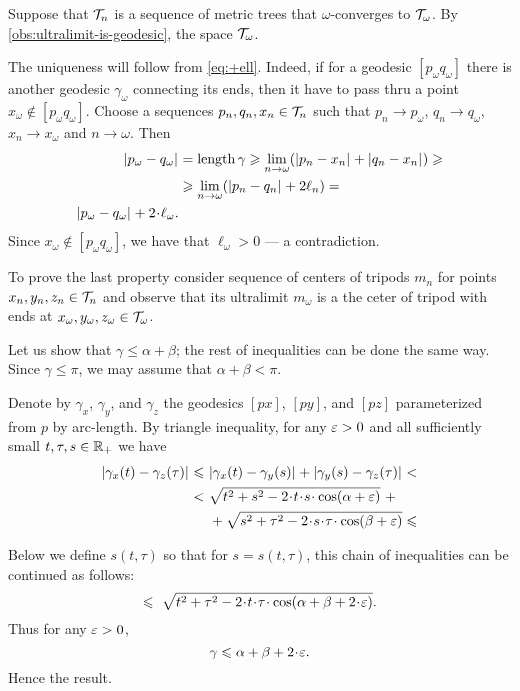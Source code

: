 Suppose that $\mathcal{T}_n$ is a sequence of metric trees that $\omega$-converges to $\mathcal{T}_\omega$.
By \ref{obs:ultralimit-is-geodesic}, the space $\mathcal{T}_\omega$.

The uniqueness will follow from \ref{eq:+ell}.
Indeed, if for a geodesic $[p_\omega q_\omega]$ there is another geodesic $\gamma_\omega$ connecting its ends,
then it have to pass thru a point $x_\omega\notin [p_\omega q_\omega]$.
Choose a sequences $p_n,q_n,x_n\in\mathcal{T}_n$ such that $p_n\to p_\omega$, $q_n\to q_\omega$, $x_n\to x_\omega$ and $n\to\omega$.
Then 
\begin{align*}
\dist{p_\omega}{q_\omega}{}&=\length\gamma\ge \lim_{n\to\omega}(\dist{p_n}{x_n}{}+\dist{q_n}{x_n}{})\ge
\\
&\ge \lim_{n\to\omega}(\dist{p_n}{q_n}{}+2\ell_n)=
\\
\dist{p_\omega}{q_\omega}{}+2\cdot\ell_\omega.
\end{align*}
Since $x_\omega\notin [p_\omega q_\omega]$, we have that $\ell_\omega>0$ --- a contradiction.

To prove the last property consider sequence of centers of tripods $m_n$ for points $x_n,y_n,z_n\in \mathcal{T}_n$ and observe that its ultralimit $m_\omega$ is a the ceter of tripod with ends at $x_\omega,y_\omega,z_\omega\in \mathcal{T}_\omega$.


Let us show that $\gamma\le\alpha+\beta$; the rest of inequalities can be done the same way.
Since $\gamma\le\pi$, we may assume that $\alpha+\beta< \pi$.

Denote by $\gamma_x$, $\gamma_y$, and $\gamma_z$ the geodesics $[px]$, $[py]$, and $[pz]$ parameterized from $p$ by arc-length.
By triangle inequality,
for any $\varepsilon>0$ and all sufficiently small $t,\tau,s\in\mathbb{R}_+$ we have
\begin{align*}
\dist{\gamma_x(t)}{\gamma_z(\tau)}{}
\le 
\ &\dist{\gamma_x(t)}{\gamma_y(s)}{}+\dist{\gamma_y(s)}{\gamma_z(\tau)}{}<\\
<
\ &\sqrt{t^2+s^2-2\cdot t\cdot  s\cdot \cos(\alpha+\eps)}\ +
\\
&+\sqrt{s^2+\tau^2-2\cdot s\cdot \tau\cdot \cos(\beta+\eps)}\le
\end{align*}

Below we define 
$s(t,\tau)$ so that for 
$s=s(t,\tau)$, this chain of inequalities can be continued as follows:
\[\le
\ \sqrt{t^2+\tau^2-2\cdot t\cdot \tau\cdot \cos(\alpha+\beta+2\cdot \eps)}.
\]
Thus for any $\varepsilon>0$, 
\[\gamma\le \alpha+\beta+2\cdot \eps.\]
Hence the result.

